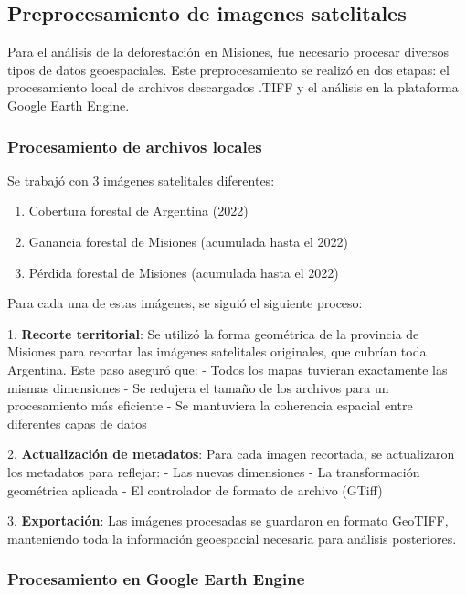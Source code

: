 \documentclass[11pt]{article}
\begin{document}
\newpage

\subsection{Preprocesamiento de imagenes satelitales}

Para el análisis de la deforestación en Misiones, fue necesario procesar diversos tipos de datos geoespaciales. Este preprocesamiento se realizó en dos etapas: el procesamiento local de archivos descargados .TIFF y el análisis en la plataforma Google Earth Engine.

\subsubsection{Procesamiento de archivos locales}
Se trabajó con 3 imágenes satelitales diferentes:
\begin{enumerate}
    \item Cobertura forestal de Argentina (2022)
    \item Ganancia forestal de Misiones (acumulada hasta el 2022)
    \item Pérdida forestal de Misiones (acumulada hasta el 2022)
\end{enumerate}

Para cada una de estas imágenes, se siguió el siguiente proceso:

1. \textbf{Recorte territorial}: Se utilizó la forma geométrica de la provincia de Misiones para recortar las imágenes satelitales originales, que cubrían toda Argentina. Este paso aseguró que:
   - Todos los mapas tuvieran exactamente las mismas dimensiones
   - Se redujera el tamaño de los archivos para un procesamiento más eficiente
   - Se mantuviera la coherencia espacial entre diferentes capas de datos

2. \textbf{Actualización de metadatos}: Para cada imagen recortada, se actualizaron los metadatos para reflejar:
   - Las nuevas dimensiones
   - La transformación geométrica aplicada
   - El controlador de formato de archivo (GTiff)

3. \textbf{Exportación}: Las imágenes procesadas se guardaron en formato GeoTIFF, manteniendo toda la información geoespacial necesaria para análisis posteriores.

\subsubsection{Procesamiento en Google Earth Engine} \label{sec:process_google_earth_engine}
\end{document}
